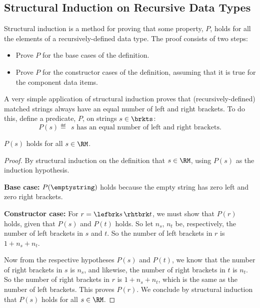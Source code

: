 
\subsection{Structural Induction on Recursive Data Types}

Structural induction is a method for proving that
some property, $P$, holds for all the elements of a recursively-defined data
type.  The proof consists of two steps:
\begin{itemize}
\item Prove $P$ for the base cases of the definition. 
\item Prove $P$ for the constructor cases of the definition, assuming that it
  is true for the component data items.  
\end{itemize}

A very simple application of structural induction proves that
(recursively-defined) matched strings always have an equal number of left
and right brackets.  To do this, define a predicate, $P$, on strings $s
\in \brkts$:
\[
P(s) \eqdef\ \ s \text{ has an equal number of left and right brackets}.
\]
\begin{theorem}\label{thm:RM-is-balanced}
$P(s)$ holds for all $s \in\RM$.
\end{theorem}

\begin{proof}

By structural induction on the definition that $s \in\RM$, using
$P(s)$ as the induction hypothesis.

\textbf{Base case:} $P(\emptystring)$ holds because the empty string has zero
left and zero right brackets.

\textbf{Constructor case:} For $r = \lefbrk s\,\rhtbrk t$, we must show
that $P(r)$ holds, given that $P(s)$ and $P(t)$ holds.  So let $n_s$,
$n_t$ be, respectively, the number of left brackets in $s$ and $t$.  So
the number of left brackets in $r$ is $1+n_s+n_t$.

Now from the respective hypotheses $P(s)$ and $P(t)$, we know that the
number of right brackets in $s$ is $n_s$, and likewise, the number of
right brackets in $t$ is $n_t$.  So the number of right brackets in
$r$ is $1+n_s+n_t$, which is the same as the number of left brackets.
This proves $P(r)$.  We conclude by structural induction that $P(s)$ holds
for all $s \in\RM$.
\end{proof}

